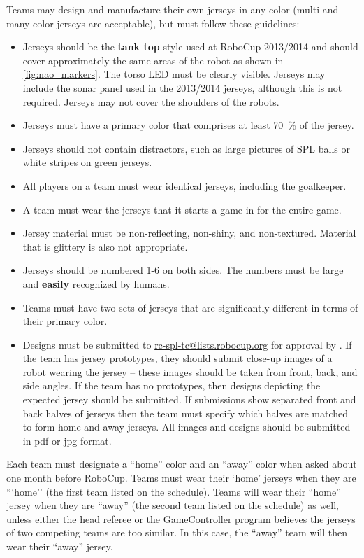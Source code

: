 Teams may design and manufacture their own jerseys in any color (multi and many color jerseys are acceptable), but must follow these guidelines:
\begin{itemize}
\item Jerseys should be the \textbf{tank top} style used at RoboCup 2013/2014 and should cover approximately the same areas of the robot as shown in \cref{fig:nao_markers}. The torso LED must be clearly visible. Jerseys may include the sonar panel used in the 2013/2014 jerseys, although this is not required. Jerseys may not cover the shoulders of the robots.
\item Jerseys must have a primary color that comprises at least \qty{70}{\percent} of the jersey.
\item Jerseys should not contain distractors, such as large pictures of SPL balls or white stripes on green jerseys.
\item All players on a team must wear identical jerseys, including the goalkeeper.
\item A team must wear the jerseys that it starts a game in for the entire game.
\item Jersey material must be non-reflecting, non-shiny, and non-textured.  Material that is glittery is also not appropriate.
\item Jerseys should be numbered 1-6 on both sides.  The numbers must be large and {\bf easily} recognized by humans.
\item Teams must have two sets of jerseys that are significantly different in terms of their primary color.
\item Designs must be submitted to \url{rc-spl-tc@lists.robocup.org} for approval by . If the team has jersey prototypes, they should submit close-up images of a robot wearing the jersey -- these images should be taken from front, back, and side angles.  If the team has no prototypes, then designs depicting the expected jersey should be submitted.  If submissions show separated front and back halves of jerseys then the team must specify which halves are matched to form home and away jerseys.  All images and designs should be submitted in pdf or jpg format.
\end{itemize}

Each team must designate a ``home'' color and an ``away'' color when asked about one month before RoboCup. Teams must wear their `home' jerseys when they are ```home'' (the first team listed on the schedule). Teams will wear their ``home'' jersey when they are ``away'' (the second team listed on the schedule) as well, unless either the head referee or the GameController program believes the jerseys of two competing teams are too similar.  In this case, the ``away'' team will then wear their ``away'' jersey.

